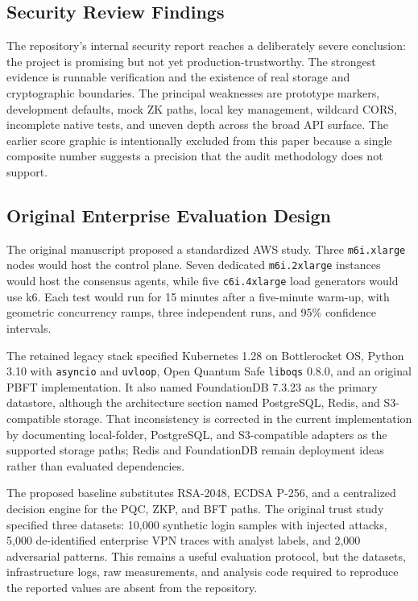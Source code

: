 \documentclass[10pt]{article}
\begin{document}
\subsection*{Security Review Findings}

The repository's internal security report reaches a deliberately severe conclusion: the project is promising but not yet production-trustworthy. The strongest evidence is runnable verification and the existence of real storage and cryptographic boundaries. The principal weaknesses are prototype markers, development defaults, mock ZK paths, local key management, wildcard CORS, incomplete native tests, and uneven depth across the broad API surface. The earlier score graphic is intentionally excluded from this paper because a single composite number suggests a precision that the audit methodology does not support.

\subsection*{Original Enterprise Evaluation Design}

The original manuscript proposed a standardized AWS study. Three \texttt{m6i.xlarge} nodes would host the control plane. Seven dedicated \texttt{m6i.2xlarge} instances would host the consensus agents, while five \texttt{c6i.4xlarge} load generators would use k6. Each test would run for 15 minutes after a five-minute warm-up, with geometric concurrency ramps, three independent runs, and 95\% confidence intervals.

The retained legacy stack specified Kubernetes 1.28 on Bottlerocket OS, Python 3.10 with \texttt{asyncio} and \texttt{uvloop}, Open Quantum Safe \texttt{liboqs} 0.8.0, and an original PBFT implementation. It also named FoundationDB 7.3.23 as the primary datastore, although the architecture section named PostgreSQL, Redis, and S3-compatible storage. That inconsistency is corrected in the current implementation by documenting local-folder, PostgreSQL, and S3-compatible adapters as the supported storage paths; Redis and FoundationDB remain deployment ideas rather than evaluated dependencies.

The proposed baseline substitutes RSA-2048, ECDSA P-256, and a centralized decision engine for the PQC, ZKP, and BFT paths. The original trust study specified three datasets: 10,000 synthetic login samples with injected attacks, 5,000 de-identified enterprise VPN traces with analyst labels, and 2,000 adversarial patterns. This remains a useful evaluation protocol, but the datasets, infrastructure logs, raw measurements, and analysis code required to reproduce the reported values are absent from the repository.
\end{document}
